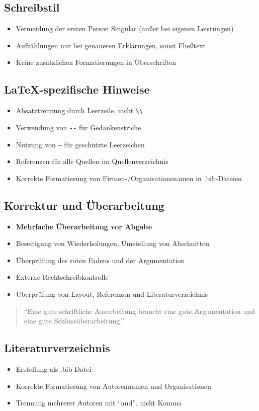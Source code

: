 \documentclass[a4paper,12pt]{article}
\begin{document}
\subsection{Schreibstil}
\begin{itemize}
    \item Vermeidung der ersten Person Singular (außer bei eigenen Leistungen)
    \item Aufzählungen nur bei genaueren Erklärungen, sonst Fließtext
    \item Keine zusätzlichen Formatierungen in Überschriften
\end{itemize}

\subsection{LaTeX-spezifische Hinweise}
\begin{itemize}
    \item Absatztrennung durch Leerzeile, nicht \verb|\\|
    \item Verwendung von \verb|--| für Gedankenstriche
    \item Nutzung von \verb|~| für geschützte Leerzeichen
    \item Referenzen für alle Quellen im Quellenverzeichnis
    \item Korrekte Formatierung von Firmen-/Organisationsnamen in .bib-Dateien
\end{itemize}

\subsection{Korrektur und Überarbeitung}
\begin{itemize}
    \item \textbf{Mehrfache Überarbeitung vor Abgabe}
    \item Beseitigung von Wiederholungen, Umstellung von Abschnitten
    \item Überprüfung des roten Fadens und der Argumentation
    \item Externe Rechtschreibkontrolle
    \item Überprüfung von Layout, Referenzen und Literaturverzeichnis
\end{itemize}

\begin{quote}
``Eine gute schriftliche Ausarbeitung braucht eine gute Argumentation und eine gute Schlussüberarbeitung.''
\end{quote}

\subsection{Literaturverzeichnis}
\begin{itemize}
    \item Erstellung als .bib-Datei
    \item Korrekte Formatierung von Autorennamen und Organisationen
    \item Trennung mehrerer Autoren mit ``and'', nicht Komma
\end{itemize}
\end{document}
